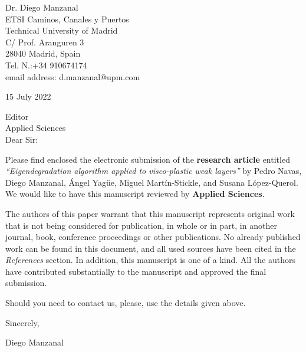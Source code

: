 \documentclass[10pt]{letter}
\begin{document}
Dr. Diego Manzanal\\
ETSI Caminos, Canales y Puertos\\
Technical University of Madrid\\
C/ Prof. Aranguren 3\\
28040 Madrid, Spain\\
Tel. N.:+34 910674174\\
email address: d.manzanal@upm.com\\

\vspace{.2in}

15 July 2022

\vspace{.3in}

Editor\\
Applied Sciences\\



Dear Sir:

\vspace{.2in}

Please find enclosed the electronic submission of the
\textbf{research article} entitled \textit{``Eigendegradation algorithm applied to visco-plastic weak layers''} by Pedro Navas, Diego Manzanal, \'Angel Yag\"ue, Miguel Mart\'in-Stickle,
and  Susana L\'opez-Querol. We would like to have this manuscript reviewed by \textbf{Applied Sciences}.

The authors of this paper warrant that this manuscript represents
original work that is not being considered for publication, in
whole or in part, in another journal, book, conference proceedings
or other publications. No already published work can be found in
this document, and all used sources have been cited in the
\textit{References} section. In addition, this manuscript is one
of a kind. All the authors have contributed substantially to the
manuscript and approved the final submission.

Should you need to contact us, please, use the details given above.



\vspace{.1in}

Sincerely,

\vspace{.3in}

Diego Manzanal
\end{document}
